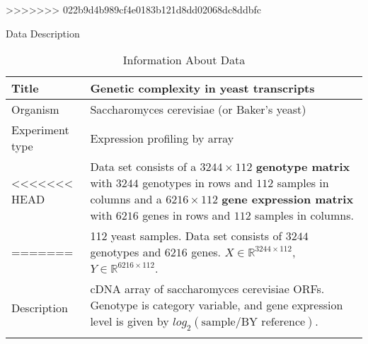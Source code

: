>>>>>>> 022b9d4b989cf4e0183b121d8dd02068dc8ddbfc
\begin{frame}{Data Description}
\begin{table}[h]
        \centering

        \begin{tabular}{|l|p{7cm}|}
            \hline
            Title                           &   Genetic complexity in yeast transcripts \\ \hline
            Organism                        &   Saccharomyces cerevisiae (or Baker's yeast)                \\ \hline
            Experiment type                 &   Expression profiling by array           \\ \hline
<<<<<<< HEAD
            \multirow{4}{*}{Data Size}      &   Data set consists of a $3244\times112$ \textbf{genotype matrix} with $3244$ genotypes in rows and $112$ samples in columns and a $6216\times112$ \textbf{gene expression matrix} with $6216$ genes in rows and $112$ samples in columns.  \\ \hline
=======
            \multirow{3}{*}{Data Size}      &   112 yeast samples. Data set consists of $3244$ genotypes and $6216$ genes.  $X \in \mathbb{R}^{3244\times112}$, $Y \in \mathbb{R}^{6216\times112}$. \\ \hline
           \multirow{3}{*}{Description}     &   cDNA array of saccharomyces cerevisiae ORFs. Genotype is category variable, and gene expression level is given by  $log_2(\text{sample} / \text{BY reference})$. \\ \hline
>>>>>>> 022b9d4b989cf4e0183b121d8dd02068dc8ddbfc
        \end{tabular}
        \caption{Information About Data}
    \end{table}
\end{frame}

